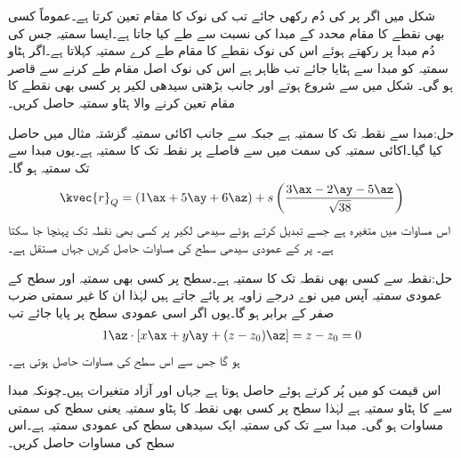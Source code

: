 شکل  میں اگر  پر  کی دُم رکھی جائے تب   کی نوک  کا مقام تعین کرتا ہے۔عموماً کسی بھی نقطے کا مقام محدد کے مبدا  کی نسبت سے طے کیا جاتا ہے۔ایسا سمتیہ جس کی دُم مبدا پر رکھتے ہوئے اس کی نوک نقطے کا مقام طے کرے   سمتیہ کہلاتا ہے۔اگر ہٹاو سمتیہ کو مبدا سے ہٹایا جائے تب ظاہر ہے اس کی نوک اصل مقام طے کرنے سے قاصر ہو گی۔
شکل  میں  سے شروع ہوتے اور   جانب بڑھتی سیدھی لکیر پر کسی بھی نقطے کا مقام تعین کرنے والا ہٹاو سمتیہ حاصل کریں۔

حل:مبدا  سے  نقطہ  تک کا سمتیہ  ہے جبکہ  سے  جانب اکائی سمتیہ  گزشتہ مثال میں حاصل کیا گیا۔اکائی سمتیہ  کی سمت میں   سے  فاصلے پر نقطہ  تک کا سمتیہ  ہے۔یوں مبدا سے   تک سمتیہ  ہو گا۔
\begin{align*}
\kvec{r}_Q=(1\ax+5\ay+6\az) +s \left(\frac{3\ax-2\ay-5\az}{\sqrt{38}}\right)
\end{align*}   
اس مساوات میں  متغیرہ ہے جسے تبدیل کرتے ہوئے سیدھی لکیر پر کسی بھی نقطہ  تک پہنچا جا سکتا ہے۔
 پر  کے عمودی سیدھی سطح کی مساوات حاصل کریں جہاں  مستقل ہے۔ 

حل:نقطہ  سے کسی بھی نقطہ  تک کا سمتیہ  ہے۔سطح پر کسی بھی سمتیہ اور سطح کے عمودی سمتیہ آپس میں نوے درجے زاویہ پر پائے جاتے ہیں لہٰذا ان کا غیر سمتی ضرب صفر کے برابر ہو گا۔یوں اگر  اسی عمودی سطح پر پایا جائے تب
\begin{align*}
1\az \cdot [x\ax+y\ay+(z-z_0)\az]=z-z_0=0
\end{align*}
ہو گا جس سے اس سطح کی مساوات  حاصل ہوتی ہے۔

اس قیمت کو  میں پُر کرتے ہوئے  حاصل ہوتا ہے جہاں  اور  آزاد متغیرات ہیں۔چونکہ مبدا سے  کا ہٹاو سمتیہ  ہے لہٰذا  سطح پر کسی بھی نقطہ  کا ہٹاو سمتیہ یعنی سطح کی سمتی مساوات   ہو گی۔
مبدا سے  تک کی سمتیہ ایک سیدھی سطح کی عمودی سمتیہ ہے۔اس سطح کی  مساوات حاصل کریں۔

